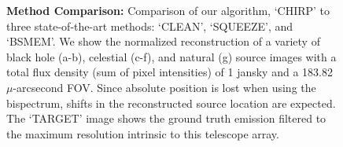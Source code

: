 \begin{figure}[ht!]
\begin{center}
\begin{tabular}{  c | c  c |  c  c  c  c | c  }
				
			\end{tabular}
			\caption{\footnotesize{ {\bf Method Comparison: } Comparison of our algorithm, `CHIRP' to three state-of-the-art methods: `CLEAN', `SQUEEZE', and `BSMEM'. We show the normalized reconstruction of a variety of black hole (a-b), celestial (c-f), and natural (g) source images with a total flux density (sum of pixel intensities) of 1 jansky and a 183.82 $\mu$-arcsecond FOV. Since absolute position is lost when using the bispectrum, shifts in the reconstructed source location are expected. The `TARGET' image shows the ground truth emission filtered to the maximum resolution intrinsic to this telescope array.  
				}}
				\label{fig:comp}
			\end{center}
		\end{figure}


	
	
